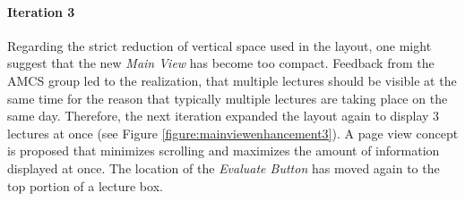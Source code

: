 \paragraph{Iteration 3}
Regarding the strict reduction of vertical space used in the layout, one might suggest that the new \emph{Main View} has become too compact.
Feedback from the AMCS group led to the realization, that multiple lectures should be visible at the same time for the reason that typically multiple lectures are taking place on the same day.
Therefore, the next iteration expanded the layout again to display 3 lectures at once (see Figure \ref{figure:mainviewenhancement3}). A page view concept is proposed that minimizes scrolling and maximizes the amount of information displayed at once. The location of the \emph{Evaluate Button} has moved again to the top portion of a lecture box.


